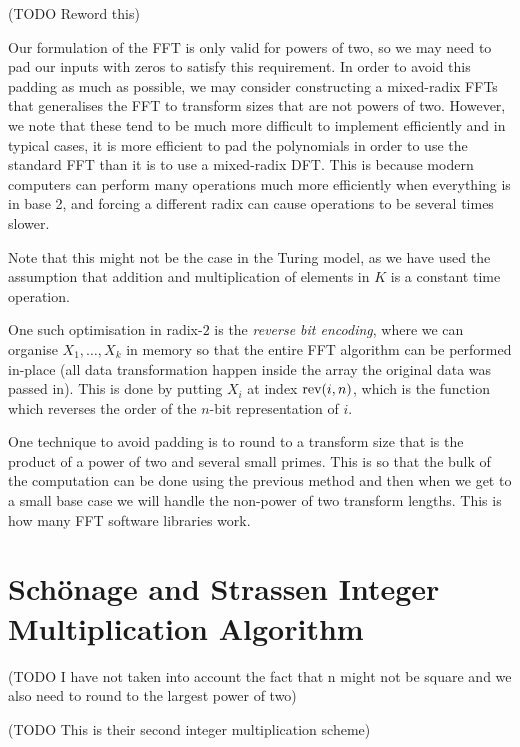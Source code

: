 \begin{remark}
    (TODO Reword this)

    \medskip

    Our formulation of the FFT is only valid for powers of two, so we may need to pad our inputs with zeros to satisfy this requirement. In order to avoid this padding as much as possible, we may consider constructing a mixed-radix FFTs that generalises the FFT to transform sizes that are not powers of two. However, we note that these tend to be much more difficult to implement efficiently and in typical cases, it is more efficient to pad the polynomials in order to use the standard FFT than it is to use a mixed-radix DFT. This is because modern computers can perform many operations much more efficiently when everything is in base 2, and forcing a different radix can cause operations to be several times slower.

Note that this might not be the case in the Turing model, as we have used the assumption that addition and multiplication of elements in $K$ is a constant time operation. 

    One such optimisation in radix-$2$ is the \emph{reverse bit encoding}, where we can organise $X_1, \ldots, X_k$ in memory so that the entire FFT algorithm can be performed in-place (all data transformation happen inside the array the original data was passed in). This is done by putting $X_i$ at index $\textrm{rev}(i, n)$, which is the function which reverses the order of the $n$-bit representation of $i$.

    One technique to avoid padding is to round to a transform size that is the product of a power of two and several small primes.
    This is so that the bulk of the computation can be done using the previous method and then when we get to a small base case we will handle the non-power of two transform lengths. This is how many FFT software libraries work.
\end{remark}


\section{Sch\"{o}nage and Strassen Integer Multiplication Algorithm}
\label{sec:schon-strass}

(TODO I have not taken into account the fact that n might not be square and we also need to round to the largest power of two)

(TODO This is their second integer multiplication scheme)


